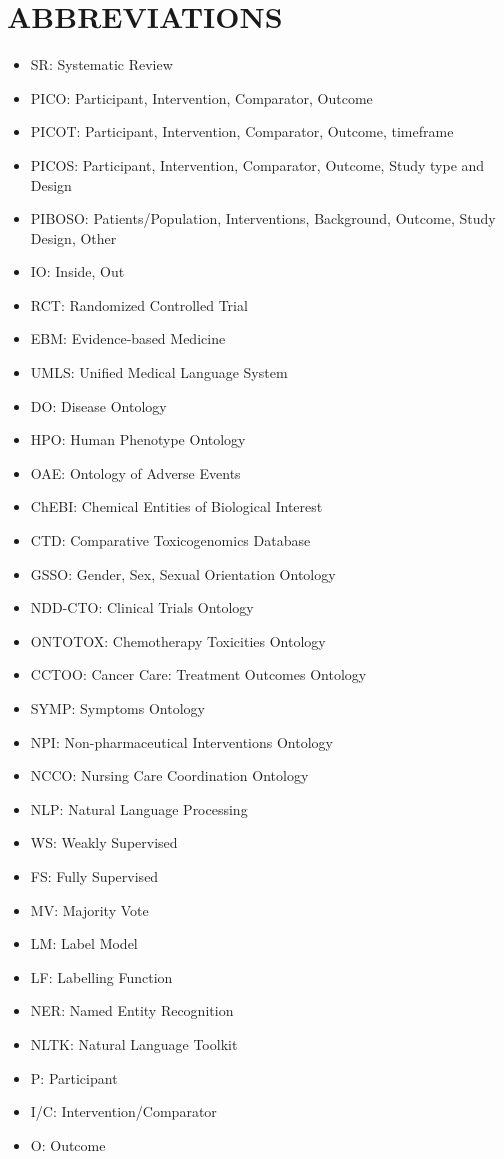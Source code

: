 \documentclass[10.7pt,]{article}
\begin{document}
\section{ABBREVIATIONS}\label{abb}
%
\begin{itemize}
    \item SR: Systematic Review 
    \item PICO: Participant, Intervention, Comparator, Outcome
    \item PICOT: Participant, Intervention, Comparator, Outcome, timeframe
    \item PICOS: Participant, Intervention, Comparator, Outcome, Study type and Design
    \item PIBOSO: Patients/Population, Interventions, Background, Outcome, Study Design, Other
    \item IO: Inside, Out
    \item RCT: Randomized Controlled Trial
    \item EBM: Evidence-based Medicine
    \item UMLS: Unified Medical Language System
    \item DO: Disease Ontology
    \item HPO: Human Phenotype Ontology
    \item OAE: Ontology of Adverse Events
    \item ChEBI: Chemical Entities of Biological Interest
    \item CTD: Comparative Toxicogenomics Database
    \item GSSO: Gender, Sex, Sexual Orientation Ontology
    \item NDD-CTO: Clinical Trials Ontology
    \item ONTOTOX: Chemotherapy Toxicities Ontology
    \item CCTOO: Cancer Care: Treatment Outcomes Ontology
    \item SYMP: Symptoms Ontology
    \item NPI: Non-pharmaceutical Interventions Ontology
    \item NCCO: Nursing Care Coordination Ontology
    \item NLP: Natural Language Processing
    \item WS: Weakly Supervised
    \item FS: Fully Supervised
    \item MV: Majority Vote
    \item LM: Label Model
    \item LF: Labelling Function
    \item NER: Named Entity Recognition
    \item NLTK: Natural Language Toolkit
    \item P: Participant
    \item I/C: Intervention/Comparator
    \item O: Outcome
\end{itemize}
%
%
%
\end{document}

